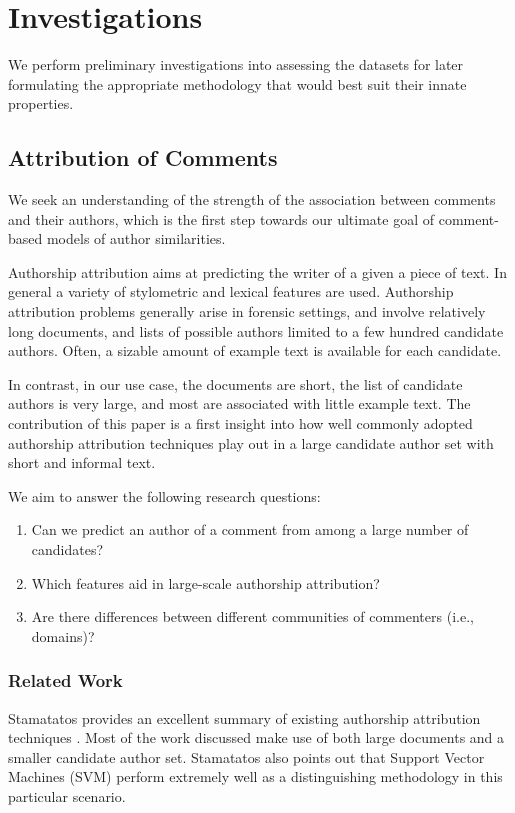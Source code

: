 \chapter{Investigations}
We perform preliminary investigations into assessing the datasets for later formulating the appropriate methodology that would best suit their innate properties.

\section{Attribution of Comments}
 We seek an understanding of the strength of the association between comments and their authors, which is the first step towards our ultimate goal of comment-based models of author similarities.

Authorship attribution aims at predicting the writer of a given a piece of text. In general a variety of stylometric and lexical features are used. Authorship attribution problems generally arise in forensic settings, and involve relatively long documents, and lists of possible authors limited to a few hundred candidate authors. Often, a sizable amount of example text is available for each candidate.

In contrast, in our use case, the documents are short, the list of candidate authors is very large, and most are associated with little example text. The contribution of this paper is a first insight into how well commonly adopted authorship attribution techniques play out in a large candidate author set with short and informal text.

We aim to answer the following research questions:  
\begin{enumerate}
\item Can we predict an author of a comment from among a large number of candidates?
\item Which features aid in large-scale authorship attribution?
\item Are there differences between different communities of commenters (i.e., domains)?
\end{enumerate}

\subsection{Related Work}

Stamatatos provides an excellent summary of existing authorship attribution techniques \cite{stamatatos_survey_2009}. Most of the work discussed make use of both large documents and a smaller candidate author set. Stamatatos also points out that Support Vector Machines (SVM) perform extremely well as a distinguishing methodology in this particular scenario.

